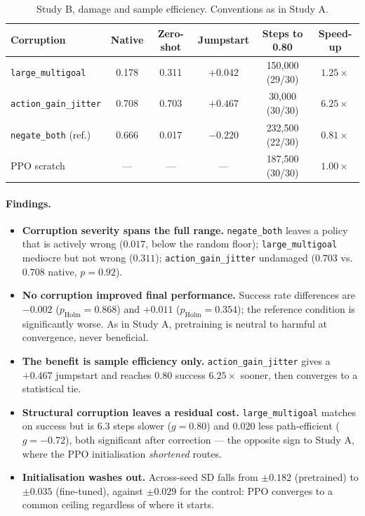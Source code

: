 \begin{table}[htbp]
\centering
\setlength{\tabcolsep}{4pt}
\caption{Study B, damage and sample efficiency. Conventions as in Study A.}
\small
\begin{tabular}{lccccc}
\toprule
Corruption & Native & Zero-shot & Jumpstart & Steps to 0.80 & Speed-up \\
\midrule
\texttt{large\_multigoal} & 0.178 & 0.311 & $+0.042$ & 150,000 (29/30) & $1.25\times$ \\
\texttt{action\_gain\_jitter} & 0.708 & 0.703 & $+0.467$ & 30,000 (30/30) & $6.25\times$ \\
\texttt{negate\_both} (ref.) & 0.666 & 0.017 & $-0.220$ & 232,500 (22/30) & $0.81\times$ \\
\midrule
PPO scratch & --- & --- & --- & 187,500 (30/30) & $1.00\times$ \\
\bottomrule
\end{tabular}
\end{table}

\paragraph{Findings.}
\begin{itemize}
  \item \textbf{Corruption severity spans the full range.} \texttt{negate\_both} leaves a policy that is actively wrong ($0.017$, below the random floor); \texttt{large\_multigoal} mediocre but not wrong ($0.311$); \texttt{action\_gain\_jitter} undamaged ($0.703$ vs.\ $0.708$ native, $p=0.92$).
  \item \textbf{No corruption improved final performance.} Success rate differences are $-0.002$ ($p_{\mathrm{Holm}}=0.868$) and $+0.011$ ($p_{\mathrm{Holm}}=0.354$); the reference condition is significantly worse. As in Study A, pretraining is neutral to harmful at convergence, never beneficial.
  \item \textbf{The benefit is sample efficiency only.} \texttt{action\_gain\_jitter} gives a $+0.467$ jumpstart and reaches $0.80$ success $6.25\times$ sooner, then converges to a statistical tie.
  \item \textbf{Structural corruption leaves a residual cost.} \texttt{large\_multigoal} matches on success but is $6.3$ steps slower ($g=0.80$) and $0.020$ less path-efficient ($g=-0.72$), both significant after correction --- the opposite sign to Study A, where the PPO initialisation \emph{shortened} routes.
  \item \textbf{Initialisation washes out.} Across-seed SD falls from $\pm0.182$ (pretrained) to $\pm0.035$ (fine-tuned), against $\pm0.029$ for the control: PPO converges to a common ceiling regardless of where it starts.
\end{itemize}

